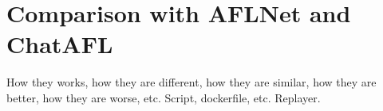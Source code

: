\chapter{Comparison with AFLNet and ChatAFL}
How they works, how they are different, how they are similar, how they are better, how they are worse, etc.
Script, dockerfile, etc.
Replayer.